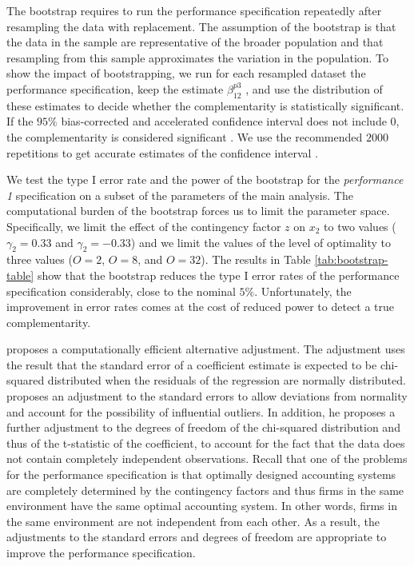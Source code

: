 \documentclass[12pt]{article}
\begin{document}
The bootstrap requires to run the performance specification repeatedly after resampling the data with replacement. The assumption of the bootstrap is that the data in the sample are representative of the broader population and that resampling from this sample approximates the variation in the population. To show the impact of bootstrapping, we run for each resampled dataset the performance specification, keep the estimate $\beta_{12}^{p3}$ , and use the distribution of these estimates to decide whether the complementarity is statistically significant. If the $95\%$ bias-corrected and accelerated confidence interval does not include $0$, the complementarity is considered significant \citep{efron_computer_2017}. We use the recommended $2000$ repetitions to get accurate estimates of the confidence interval \citep{efron_computer_2017}. 

We test the type I error rate and the power of the bootstrap for the \emph{performance 1} specification on a subset of the parameters of the main analysis. The computational burden of the bootstrap forces us to limit the parameter space. Specifically, we limit the effect of the contingency factor $z$ on $x_2$ to two values ($\gamma_2 = 0.33$ and $\gamma_2 = -0.33$) and we limit the values of the level of optimality to three values ($O=2$, $O=8$, and $O=32$). The results in Table \ref{tab:bootstrap-table} show that the bootstrap reduces the type I error rates of the performance specification considerably, close to the nominal $5\%$.  Unfortunately, the improvement in error rates comes at the cost of reduced power to detect a true complementarity.



\citet{young_improved_2016} proposes a computationally efficient alternative adjustment. The adjustment uses the result that the standard error of a coefficient estimate is expected to be chi-squared distributed when the residuals of the regression are normally distributed. \cite{young_improved_2016} proposes an adjustment to the standard errors to allow deviations from normality and account for the possibility of influential outliers. In addition, he proposes a further adjustment to the degrees of freedom of the chi-squared distribution and thus of the t-statistic of the coefficient, to account for the fact that the data does not contain completely independent observations. Recall that one of the problems for the performance specification is that optimally designed accounting systems are completely determined by the contingency factors and thus firms in the same environment have the same optimal accounting system. In other words, firms in the same environment are not independent from each other. As a result, the adjustments to the standard errors and degrees of freedom are appropriate to improve the performance specification.
\end{document}
